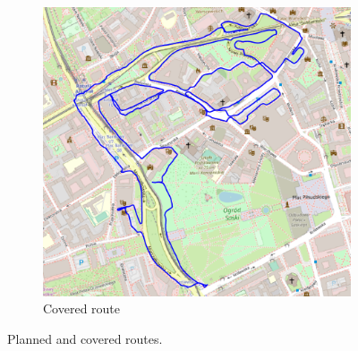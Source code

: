 \documentclass[a4paper,12pt]{article}
\begin{document}
\begin{enumerate}
\begin{figure}[H]
\begin{subfigure}{.75\textwidth}
			\includegraphics[width=1\linewidth]{route_c17}
			\caption{Covered route}
			\label{fig:b17}
		\end{subfigure}
		\caption{Planned and covered routes.}
		\label{fig:fig17}
	\end{figure} 
\end{enumerate}
\end{document}
